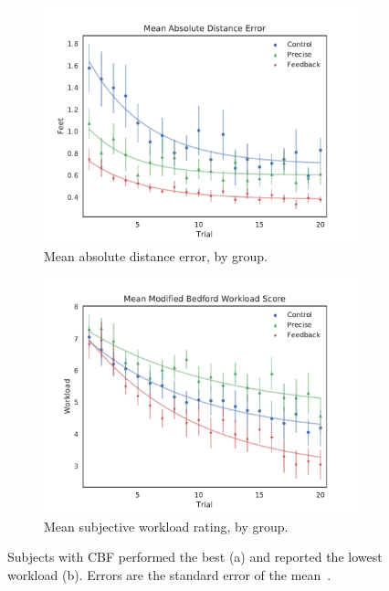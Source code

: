 \documentclass[float=false, crop=false]{standalone}
\begin{document}
\begin{figure}[tb!]
    \begin{center}
        \begin{subfigure}{0.49\textwidth}
            \includegraphics[width=\linewidth]{./../img/Group_absDistErr_clean_fit_30.pdf}
            \caption{Mean absolute distance error, by group.}
            \label{figure:saferdistance}
        \end{subfigure}\hfill
        \begin{subfigure}{0.49\textwidth}
            \includegraphics[width=\linewidth]{./../img/Group_Workload_fit_30.pdf}
            \caption{Mean subjective workload rating, by group.}
            \label{figure:saferworkload}
        \end{subfigure}
        \caption{Subjects with CBF performed the best (a) and reported the lowest workload (b). Errors are the standard error of the mean~\cite{Karasinski2016Masters}.}
    \end{center}
\end{figure}
\end{document}
